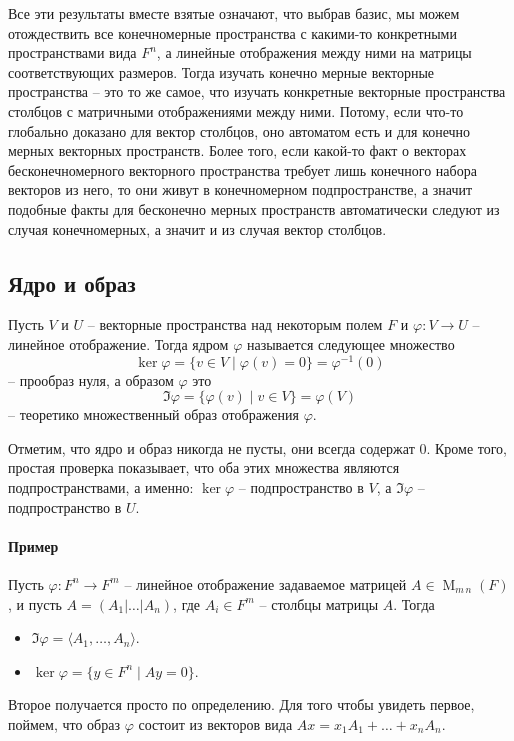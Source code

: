 Все эти результаты вместе взятые означают, что выбрав базис, мы можем отождествить все конечномерные пространства с какими-то конкретными пространствами вида $F^n$, а линейные отображения между ними на матрицы соответствующих размеров. Тогда изучать конечно мерные векторные пространства -- это то же самое, что изучать конкретные векторные пространства столбцов с матричными отображениями между ними. Потому, если что-то глобально доказано для вектор столбцов, оно автоматом есть и для конечно мерных векторных пространств. Более того, если какой-то факт о векторах бесконечномерного векторного пространства требует лишь конечного набора векторов из него, то они живут в конечномерном подпространстве, а значит подобные факты для бесконечно мерных пространств автоматически следуют из случая конечномерных, а значит и из случая вектор столбцов.

\subsection{Ядро и образ}

\begin{definition}
Пусть $V$ и $U$ -- векторные пространства над некоторым полем $F$ и $\varphi\colon V\to U$ -- линейное отображение. Тогда ядром $\varphi$ называется следующее множество
\[
\ker \varphi = \{v\in V \mid \varphi(v) = 0\} = \varphi^{-1}(0)
\]
-- прообраз нуля, а образом $\varphi$ это
\[
\Im \varphi = \{\varphi(v)\mid v\in V\} = \varphi(V)
\]
-- теоретико множественный образ отображения $\varphi$.
\end{definition}

Отметим, что ядро и образ никогда не пусты, они всегда содержат $0$. Кроме того, простая проверка показывает, что оба этих множества являются подпространствами, а именно: $\ker\varphi$ -- подпространство в $V$, а $\Im \varphi $ -- подпространство в $U$.

\paragraph{Пример}

Пусть $\varphi \colon F^n\to F^m$ -- линейное отображение задаваемое матрицей $A\in\operatorname{M}_{m\,n}(F)$, и пусть $A = (A_1|\ldots|A_n)$, где $A_i\in F^m$ -- столбцы матрицы $A$. Тогда
\begin{itemize}
\item $\Im \varphi = \langle A_1,\ldots,A_n\rangle$.
\item $\ker \varphi = \{y\in F^n\mid Ay = 0\}$.
\end{itemize}
Второе получается просто по определению. Для того чтобы увидеть первое, поймем, что образ $\varphi$ состоит из векторов вида $Ax = x_1 A_1 + \ldots + x_n A_n$.


